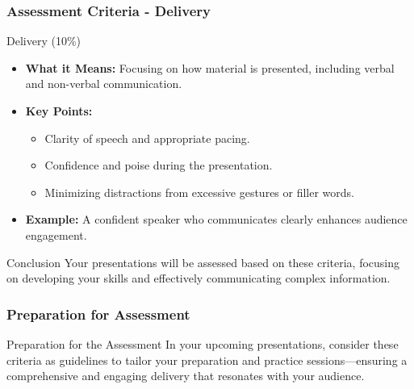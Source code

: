 \documentclass[aspectratio=169]{beamer}
\begin{document}
\begin{frame}[fragile]
    \frametitle{Assessment Criteria - Delivery}
    \begin{block}{Delivery (10\%)}
        \begin{itemize}
            \item \textbf{What it Means:} Focusing on how material is presented, including verbal and non-verbal communication.
            \item \textbf{Key Points:}
            \begin{itemize}
                \item Clarity of speech and appropriate pacing.
                \item Confidence and poise during the presentation.
                \item Minimizing distractions from excessive gestures or filler words.
            \end{itemize}
            \item \textbf{Example:} A confident speaker who communicates clearly enhances audience engagement.
        \end{itemize}
    \end{block}
    
    \begin{block}{Conclusion}
        Your presentations will be assessed based on these criteria, focusing on developing your skills and effectively communicating complex information.
    \end{block}
\end{frame}

\begin{frame}[fragile]
    \frametitle{Preparation for Assessment}
    \begin{block}{Preparation for the Assessment}
        In your upcoming presentations, consider these criteria as guidelines to tailor your preparation and practice sessions—ensuring a comprehensive and engaging delivery that resonates with your audience.
    \end{block}
\end{frame}
\end{document}
